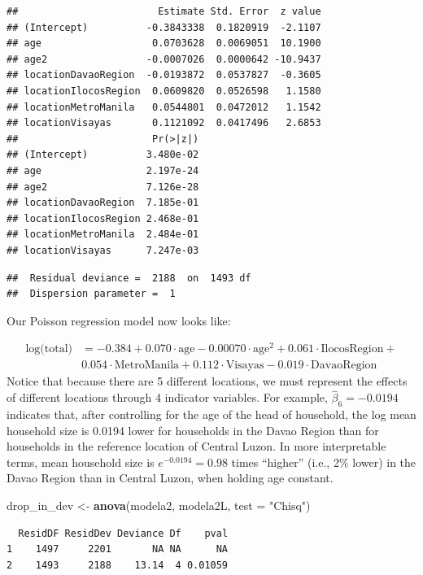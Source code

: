 \documentclass[
]{krantz}
\newenvironment{Shaded}{\begin{snugshade}}{\end{snugshade}}
\newcommand{\DataTypeTok}[1]{\textcolor[rgb]{0.27,0.27,0.27}{#1}}
\newcommand{\KeywordTok}[1]{\textcolor[rgb]{0.27,0.27,0.27}{\textbf{#1}}}
\newcommand{\NormalTok}[1]{#1}
\newcommand{\StringTok}[1]{\textcolor[rgb]{0.5,0.5,0.5}{#1}}
\begin{document}
\begin{verbatim}
##                        Estimate Std. Error  z value
## (Intercept)          -0.3843338  0.1820919  -2.1107
## age                   0.0703628  0.0069051  10.1900
## age2                 -0.0007026  0.0000642 -10.9437
## locationDavaoRegion  -0.0193872  0.0537827  -0.3605
## locationIlocosRegion  0.0609820  0.0526598   1.1580
## locationMetroManila   0.0544801  0.0472012   1.1542
## locationVisayas       0.1121092  0.0417496   2.6853
##                       Pr(>|z|)
## (Intercept)          3.480e-02
## age                  2.197e-24
## age2                 7.126e-28
## locationDavaoRegion  7.185e-01
## locationIlocosRegion 2.468e-01
## locationMetroManila  2.484e-01
## locationVisayas      7.247e-03
\end{verbatim}

\begin{verbatim}
##  Residual deviance =  2188  on  1493 df 
##  Dispersion parameter =  1
\end{verbatim}

Our Poisson regression model now looks like:

\begin{align*}
\textrm{log(total)} & = -0.384 + 0.070 \cdot \textrm{age} - 0.00070 \cdot \textrm{age}^2 +0.061 \cdot \textrm{IlocosRegion} + \\ 
 & 0.054 \cdot\textrm{MetroManila}  +0.112 \cdot\textrm{Visayas} - 0.019 \cdot \textrm{DavaoRegion}
\end{align*}
Notice that because there are 5 different locations, we must represent the effects of different locations through 4 indicator variables. For example, \(\hat{\beta}_6=-0.0194\) indicates that, after controlling for the age of the head of household, the log mean household size is 0.0194 lower for households in the Davao Region than for households in the reference location of Central Luzon. In more interpretable terms, mean household size is \(e^{-0.0194}=0.98\) times ``higher'' (i.e., 2\% lower) in the Davao Region than in Central Luzon, when holding age constant.

\begin{Shaded}
\begin{Highlighting}[]
\NormalTok{drop_in_dev <-}\StringTok{ }\KeywordTok{anova}\NormalTok{(modela2, modela2L, }\DataTypeTok{test =} \StringTok{"Chisq"}\NormalTok{)}
\end{Highlighting}
\end{Shaded}

\begin{verbatim}
  ResidDF ResidDev Deviance Df    pval
1    1497     2201       NA NA      NA
2    1493     2188    13.14  4 0.01059
\end{verbatim}
\end{document}
